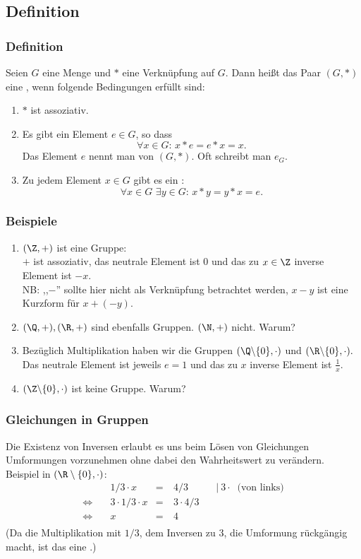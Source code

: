 \subsection{Definition}
%
\begin{frame}\frametitle{Definition}
	
	Seien $G$ eine Menge und $\ast$ eine Verknüpfung auf $G$.
	Dann hei{\ss}t das Paar $(G,\ast)$ eine , wenn folgende Bedingungen erfüllt sind:
	\begin{enumerate}
		\item $\ast$ ist assoziativ. \pause
		\item Es gibt ein Element $e\in G$, so dass
			$$
				\forall x\in G:\, x\ast e = e\ast x = x.
			$$
			Das Element $e$ nennt man  von $(G,\ast)$. Oft schreibt man $e_G$. \pause 
		\item Zu jedem Element $x\in G$ gibt es ein :
			$$
				\forall x\in G\,\, \exists y\in G:\, x\ast y = y\ast x = e.
			$$
	\end{enumerate}

\end{frame}
%
%
\begin{frame}\frametitle{Beispiele}
	
	\begin{enumerate}
		\item $(\Z,+)$ ist eine Gruppe:\\
			$+$ ist assoziativ, das neutrale Element ist $0$ und das zu $x\in\Z$ inverse Element ist $-x$.\\
			NB: ,,$-$'' sollte hier nicht als Verknüpfung betrachtet werden, $x-y$ ist eine Kurzform für $x+(-y)$.
		\pause
		\item $(\Q,+), (\R,+)$ sind ebenfalls Gruppen. $(\N,+)$ nicht. Warum? 
		\pause
		\item Bezüglich Multiplikation  haben wir die Gruppen
			$
				(\Q\backslash\{0\}, \cdot)$ und $ (\R\backslash\{0\}, \cdot).
			$
			Das neutrale Element ist jeweils $e=1$ und das zu $x$ inverse Element ist $\frac{1}{x}$.
		\pause
		\item $(\Z\backslash\{0\},\cdot)$ ist keine Gruppe. Warum?
	\end{enumerate}
	
\end{frame}
%
\begin{frame}\frametitle{Gleichungen in Gruppen}
Die Existenz von Inversen erlaubt es uns beim Lösen von Gleichungen Umformungen vorzunehmen ohne dabei den Wahrheitswert zu verändern.\\\pause
Beispiel in $(\R\setminus \{0\}, \cdot)$:
\begin{align*}
&1/3 \cdot x &=&\ 4/3 \qquad & | \ 3 \cdot \ \text{ (von links)} \\
\Leftrightarrow \quad& 3\cdot 1/3\cdot x &=&\ 3 \cdot 4/3 & \\
\Leftrightarrow \quad& x &=&\ 4 &  \\
\end{align*}
(Da die Multiplikation mit $1/3$, dem Inversen zu $3$, die Umformung rückgängig macht, ist das eine .)
\end{frame}
